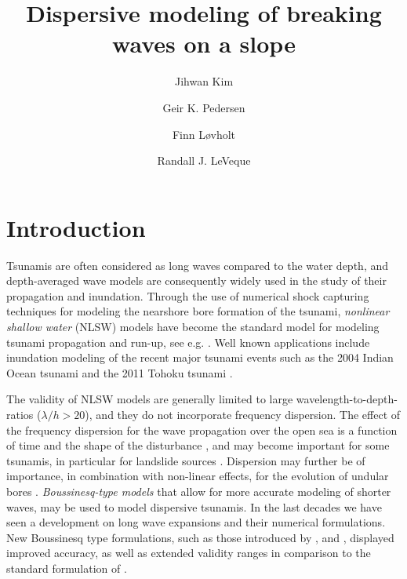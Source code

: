 \documentclass[review]{elsarticle}
\begin{document}
\begin{frontmatter}

\title{Dispersive modeling of breaking waves  on a slope}

\author[1]{Jihwan Kim}
\author[1]{Geir K. Pedersen}
\author[1,2]{Finn L{\o}vholt}
\author[3]{Randall J. LeVeque}

\address[1]{University of Oslo, Department of Mathematics, 
Oslo, Norway}
\address[2]{Norwegian Geotechnical Institute,
Oslo, Norway}
\address[3]{University of Washington, Department of Applied Mathematics, Seattle, USA}

\begin{abstract}

\end{abstract}

\begin{keyword}

\end{keyword}

\end{frontmatter}

\linenumbers

\section{Introduction}

Tsunamis are often considered as long waves compared to the water depth, and 
depth-averaged wave models are consequently widely used in the study of their propagation and inundation.
Through the use of numerical shock capturing techniques for modeling
the nearshore bore formation of the tsunami, {\em nonlinear shallow water} (NLSW) models
have become the standard model for modeling tsunami propagation and run-up, see e.g. 
\citep{titov1995modeling,Imamura1996b,Harig2008,BergerGeorgeLeVequeMandli11}.
Well known applications include inundation modeling of the recent major tsunami events 
such as the 2004 Indian Ocean tsunami \citep{Borrero2006,Kaiser2011} and the 2011 Tohoku tsunami \citep{Hooper2013,Romano2014}. 

The validity of NLSW models are generally limited to large wavelength-to-depth-ratios ($\lambda/h>20$), and they
do not incorporate frequency dispersion. The effect of the frequency dispersion for the wave propagation over the open sea is 
a function of time and the shape of the disturbance \cite{Glimsdal2013},
and may become important for some tsunamis, in particular for landslide sources \cite{Lovholt2015}. 
Dispersion may further be of importance, in combination with non-linear effects,
for the evolution of undular bores \cite{Behrens2015}.
{\em Boussinesq-type models} that allow for more accurate modeling of shorter waves, may be used to model dispersive tsunamis.
In the last decades we have seen a development on long wave expansions and their numerical formulations. 
New Boussinesq type formulations, such as those introduced by \cite{madsen1992new}, and \cite{nwogu1993alternative}, displayed improved accuracy, as well as extended validity ranges in comparison to the standard formulation of \cite{peregrine1967long}.
\end{document}
